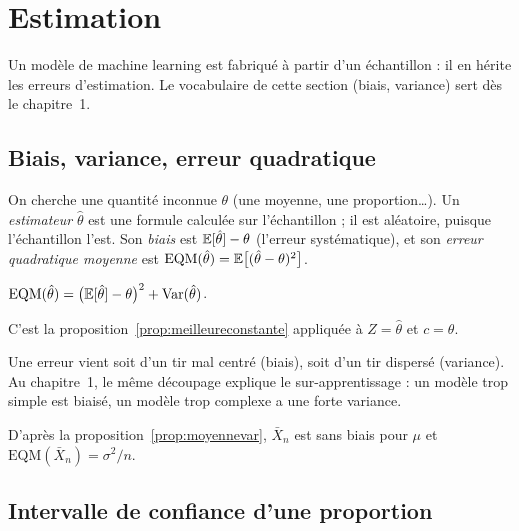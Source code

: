 \section{Estimation}
\label{sec:statistique}

Un modèle de machine learning est fabriqué à partir d'un échantillon : il en hérite les erreurs d'estimation. Le vocabulaire de cette section (biais, variance) sert dès le chapitre~1.

\subsection{Biais, variance, erreur quadratique}

\begin{definition}
On cherche une quantité inconnue $\theta$ (une moyenne, une proportion\dots). Un \emph{estimateur} $\hat\theta$ est une formule calculée sur l'échantillon ; il est aléatoire, puisque l'échantillon l'est.
Son \emph{biais} est $\mathbb{E}[\hat\theta]-\theta$ (l'erreur systématique), et son \emph{erreur quadratique moyenne} est $\mathrm{EQM}(\hat\theta)=\mathbb{E}\big[(\hat\theta-\theta)^2\big]$.
\end{definition}

\begin{proposition}
\label{prop:biaisvariance}
$\mathrm{EQM}(\hat\theta)=\big(\mathbb{E}[\hat\theta]-\theta\big)^2+\operatorname{Var}(\hat\theta)$.
\end{proposition}
\begin{preuve}
C'est la proposition~\ref{prop:meilleureconstante} appliquée à $Z=\hat\theta$ et $c=\theta$.
\end{preuve}

\begin{remarque}[Lecture]
Une erreur vient soit d'un tir mal centré (biais), soit d'un tir dispersé (variance). Au chapitre~1, le même découpage explique le sur-apprentissage : un modèle trop simple est biaisé, un modèle trop complexe a une forte variance.
\end{remarque}

\begin{exemple}
D'après la proposition~\ref{prop:moyennevar}, $\bar X_n$ est sans biais pour $\mu$ et $\mathrm{EQM}(\bar X_n)=\sigma^2/n$.
\end{exemple}

\subsection{Intervalle de confiance d'une proportion}

